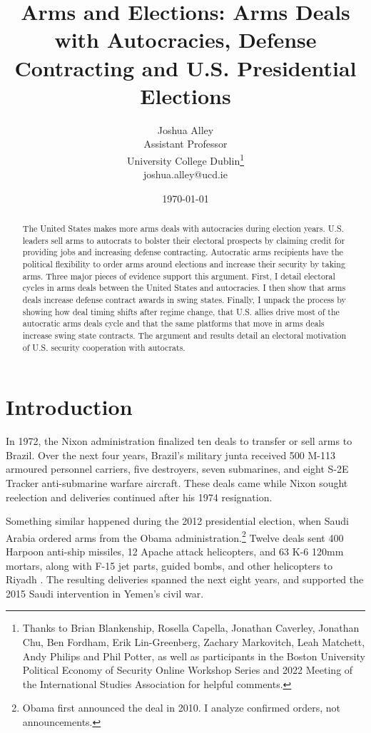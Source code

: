 \documentclass[12pt]{article}
\title{\textbf{Arms and Elections: Arms Deals with Autocracies, Defense Contracting and U.S. Presidential Elections}}
\author{Joshua Alley \\
Assistant Professor \\
University College Dublin\thanks{Thanks to Brian Blankenship, Rosella Capella, Jonathan Caverley, Jonathan Chu, Ben Fordham, Erik Lin-Greenberg, Zachary Markovitch, Leah Matchett, Andy Philips and Phil Potter, as well as participants in the Boston University Political Economy of Security Online Workshop Series and 2022 Meeting of the International Studies Association for helpful comments.} \\
joshua.alley@ucd.ie 
}
\date{\today}
\begin{document}
\maketitle 

\begin{abstract} 
The United States makes more arms deals with autocracies during election years. 
U.S. leaders sell arms to autocrats to bolster their electoral prospects by claiming credit for providing jobs and increasing defense contracting.
Autocratic arms recipients have the political flexibility to order arms around elections and increase their security by taking arms. 
Three major pieces of evidence support this argument.  
First, I detail electoral cycles in arms deals between the United States and autocracies. 
I then show that arms deals increase defense contract awards in swing states.
Finally, I unpack the process by showing how deal timing shifts after regime change, that U.S. allies drive most of the autocratic arms deals cycle and that the same platforms that move in arms deals increase swing state contracts.  
The argument and results detail an electoral motivation of U.S. security cooperation with autocrats. 
\end{abstract} 

\thispagestyle{empty}
\setcounter{page}{0} 

\newpage 
\doublespace 


\section{Introduction}



In 1972, the Nixon administration finalized ten deals to transfer or sell arms to Brazil.
Over the next four years, Brazil's military junta received 500 M-113 armoured personnel carriers, five destroyers, seven submarines, and eight S-2E Tracker anti-submarine warfare aircraft.
These deals came while Nixon sought reelection and deliveries continued after his 1974 resignation. 


Something similar happened during the 2012 presidential election, when Saudi Arabia ordered arms from the Obama administration.\footnote{Obama first announced the deal in 2010. I analyze confirmed orders, not announcements.} 
Twelve deals sent 400 Harpoon anti-ship missiles, 12 Apache attack helicopters, and 63 K-6 120mm mortars, along with F-15 jet parts, guided bombs, and other helicopters to Riyadh \citep{SIPRI2021}. 
The resulting deliveries spanned the next eight years, and supported the 2015 Saudi intervention in Yemen's civil war.
\end{document}

